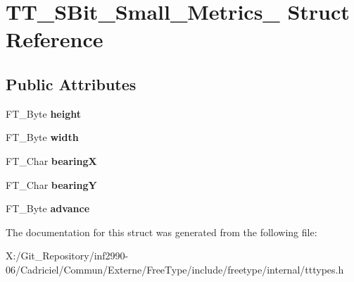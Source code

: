 \hypertarget{struct_t_t___s_bit___small___metrics__}{\section{T\-T\-\_\-\-S\-Bit\-\_\-\-Small\-\_\-\-Metrics\-\_\- Struct Reference}
\label{struct_t_t___s_bit___small___metrics__}
}
\subsection*{Public Attributes}
\begin{DoxyCompactItemize}
\item 
\hypertarget{struct_t_t___s_bit___small___metrics___aecc44b5e504d5ce27521505ed53420c8}{F\-T\-\_\-\-Byte {\bfseries height}}\label{struct_t_t___s_bit___small___metrics___aecc44b5e504d5ce27521505ed53420c8}

\item 
\hypertarget{struct_t_t___s_bit___small___metrics___ad2401ae208b1663d0085ca06a04885fe}{F\-T\-\_\-\-Byte {\bfseries width}}\label{struct_t_t___s_bit___small___metrics___ad2401ae208b1663d0085ca06a04885fe}

\item 
\hypertarget{struct_t_t___s_bit___small___metrics___a4361ae83a66706852c0c7d4c4ddff9c2}{F\-T\-\_\-\-Char {\bfseries bearing\-X}}\label{struct_t_t___s_bit___small___metrics___a4361ae83a66706852c0c7d4c4ddff9c2}

\item 
\hypertarget{struct_t_t___s_bit___small___metrics___aba8cbfd6203f4083b8fb305f88d6d1fc}{F\-T\-\_\-\-Char {\bfseries bearing\-Y}}\label{struct_t_t___s_bit___small___metrics___aba8cbfd6203f4083b8fb305f88d6d1fc}

\item 
\hypertarget{struct_t_t___s_bit___small___metrics___a056c5ea71ec3339ca9b7356ea7c90e37}{F\-T\-\_\-\-Byte {\bfseries advance}}\label{struct_t_t___s_bit___small___metrics___a056c5ea71ec3339ca9b7356ea7c90e37}

\end{DoxyCompactItemize}


The documentation for this struct was generated from the following file\-:\begin{DoxyCompactItemize}
\item 
X\-:/\-Git\-\_\-\-Repository/inf2990-\/06/\-Cadriciel/\-Commun/\-Externe/\-Free\-Type/include/freetype/internal/tttypes.\-h\end{DoxyCompactItemize}
